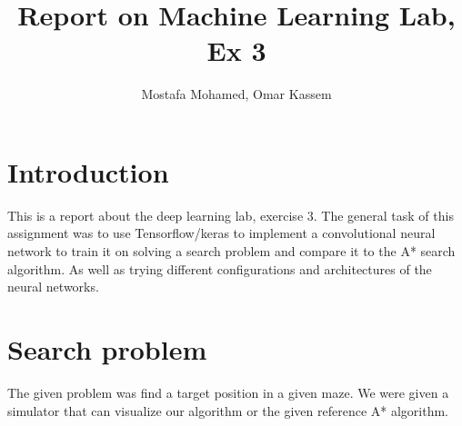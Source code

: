 \documentclass[a4paper]{article}
\begin{document}

\title{Report on Machine Learning Lab, Ex 3} %


\author{Mostafa Mohamed, Omar Kassem}%



\maketitle %




\section{Introduction}
This is a report about the deep learning lab, exercise 3. The general task of this assignment was to use Tensorflow/keras to implement a convolutional neural network to train it on solving a search problem and compare it to the A* search algorithm. As well as trying different configurations and architectures of the neural networks.

\section{Search problem}
The given problem was find a target position in a given maze. We were given a simulator that can visualize our algorithm or the given reference A* algorithm. 
\end{document}
